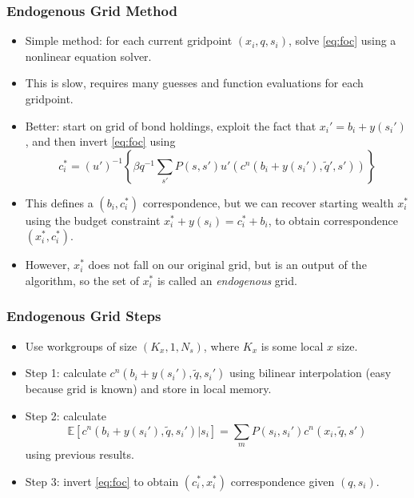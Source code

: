 \documentclass[handout]{beamer}
\newcommand{\E}{\mathbb{E}}
\theoremstyle{definition}
\begin{document}
\begin{frame}
  \frametitle{Endogenous Grid Method}
  \begin{itemize}[<+->]
  \item Simple method: for each current gridpoint $(x_i, q, s_i)$, solve \eqref{eq:foc} using a nonlinear equation solver.
  \item This is slow, requires many guesses and function evaluations for each gridpoint.
  \item Better: start on grid of bond holdings, exploit the fact that $x_i' = b_i + y(s_i')$, and then invert \eqref{eq:foc} using
    \[ c_i^* = (u')^{-1} \left\{ \beta q^{-1} \sum_{s'} P(s,s') u'(c^n(b_i + y(s_i'), \tilde{q}', s')) \right\} \]
  \item This defines a $(b_i, c_i^*)$ correspondence, but we can recover starting wealth $x_i^*$ using the budget constraint $x_i^* + y(s_i) = c_i^* + b_i$, to obtain correspondence $(x_i^*, c_i^*)$.
  \item However, $x_i^*$ does not fall on our original grid, but is an output of the algorithm, so the set of $x_i^*$ is called an \emph{endogenous} grid.
  \end{itemize}
\end{frame}

\begin{frame}
  \frametitle{Endogenous Grid Steps}
  \begin{itemize}[<+->]
  \item Use workgroups of size $(K_x, 1, N_s)$, where $K_x$ is some local $x$ size.
  \item Step 1: calculate $c^n(b_i + y(s_i'), \tilde{q}, s_i')$ using bilinear interpolation (easy because grid is known) and store in local memory.
  \item Step 2: calculate
    \[ \E \left[ c^n(b_i + y(s_i'), \tilde{q}, s_i') | s_i \right] = \sum_m P(s_i, s_i') c^n(x_i, \tilde{q}, s') \]
    using previous results.
  \item Step 3: invert \eqref{eq:foc} to obtain $(c_i^*, x_i^*)$ correspondence given $(q, s_i)$.
  \end{itemize}
\end{frame}
\end{document}
